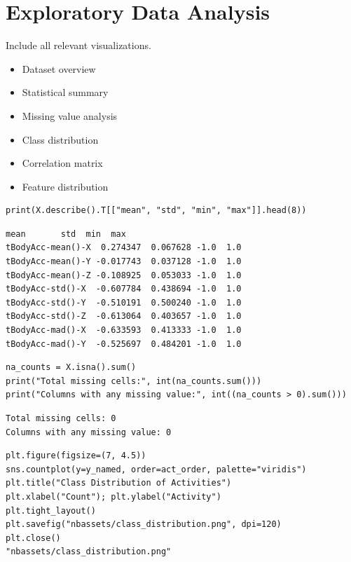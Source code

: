 \documentclass[12pt,a4paper]{article}
\begin{document}
\section{Exploratory Data Analysis}
\label{sec:org6272bec}

Include all relevant visualizations.
\begin{itemize}
\item Dataset overview
\item Statistical summary
\item Missing value analysis
\item Class distribution
\item Correlation matrix
\item Feature distribution
\end{itemize}

\begin{verbatim}
print(X.describe().T[["mean", "std", "min", "max"]].head(8))
\end{verbatim}

\begin{verbatim}
mean       std  min  max
tBodyAcc-mean()-X  0.274347  0.067628 -1.0  1.0
tBodyAcc-mean()-Y -0.017743  0.037128 -1.0  1.0
tBodyAcc-mean()-Z -0.108925  0.053033 -1.0  1.0
tBodyAcc-std()-X  -0.607784  0.438694 -1.0  1.0
tBodyAcc-std()-Y  -0.510191  0.500240 -1.0  1.0
tBodyAcc-std()-Z  -0.613064  0.403657 -1.0  1.0
tBodyAcc-mad()-X  -0.633593  0.413333 -1.0  1.0
tBodyAcc-mad()-Y  -0.525697  0.484201 -1.0  1.0
\end{verbatim}


\begin{verbatim}
na_counts = X.isna().sum()
print("Total missing cells:", int(na_counts.sum()))
print("Columns with any missing value:", int((na_counts > 0).sum()))
\end{verbatim}

\begin{verbatim}
Total missing cells: 0
Columns with any missing value: 0
\end{verbatim}


\begin{verbatim}
plt.figure(figsize=(7, 4.5))
sns.countplot(y=y_named, order=act_order, palette="viridis")
plt.title("Class Distribution of Activities")
plt.xlabel("Count"); plt.ylabel("Activity")
plt.tight_layout()
plt.savefig("nbassets/class_distribution.png", dpi=120)
plt.close()
"nbassets/class_distribution.png"
\end{verbatim}
\end{document}
